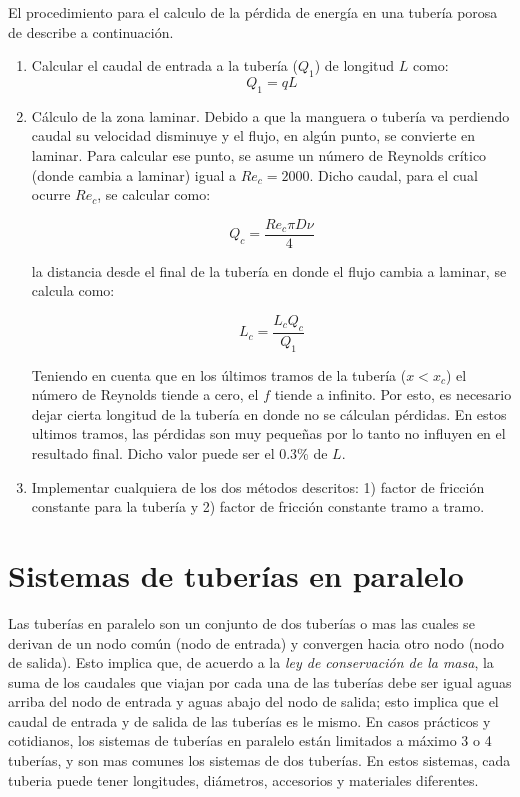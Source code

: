 \documentclass[11pt, oneside]{article}
\begin{document}
El procedimiento para el calculo de la p\'erdida de energ\'ia en una tuber\'ia porosa de describe a continuaci\'on.
\begin{enumerate}
\item Calcular el caudal de entrada a la tuber\'ia  ($Q_1$) de longitud $L$ como:
\begin{equation}
Q_1 = q L
\label{poro14}
\end{equation}

\item C\'alculo de la zona laminar. Debido a que la manguera o tuber\'ia va perdiendo caudal su velocidad disminuye y el flujo, en alg\'un punto, se convierte en laminar. Para calcular ese punto, se asume un n\'umero de Reynolds cr\'itico (donde cambia a laminar) igual a $Re_c=2000$. Dicho caudal, para el cual ocurre $Re_c$, se calcular como:

\begin{equation}
Q_c = \frac{Re_c \pi D \nu}{4}
\label{poro15}
\end{equation}

la distancia desde el final de la tuber\'ia en donde el flujo cambia a laminar, se calcula como:

\begin{equation}
L_c = \frac{L_c Q_c}{Q_1}
\label{poro16}
\end{equation}

Teniendo en cuenta que en los \'ultimos tramos de la tuber\'ia ($x < x_c$) el n\'umero de Reynolds tiende a cero,  el $f$ tiende a infinito. Por esto, es necesario dejar cierta longitud de la tuber\'ia en donde no se c\'alculan p\'erdidas. En estos ultimos tramos, las p\'erdidas son muy peque\~nas por lo tanto no influyen en el resultado final. Dicho valor puede ser el 0.3\% de $L$.

\item Implementar cualquiera de los dos m\'etodos descritos: 1) factor de fricci\'on constante para la tuber\'ia y 2) factor de fricci\'on constante tramo a tramo.

\end{enumerate}


\section{Sistemas de tuber\'ias en paralelo} 
Las tuber\'ias en paralelo son un conjunto de dos tuber\'ias o mas las cuales se derivan de un nodo com\'un (nodo de entrada) y convergen hacia otro nodo (nodo de salida). Esto implica que, de acuerdo a la \emph{ley de conservaci\'on de la masa}, la suma de los caudales que viajan por cada una de las tuber\'ias debe ser igual aguas arriba del nodo de entrada y aguas abajo del nodo de salida; esto implica que el caudal de entrada y de salida de las tuber\'ias es le mismo. En casos pr\'acticos y cotidianos, los sistemas de tuber\'ias en paralelo est\'an limitados a m\'aximo 3 o 4 tuber\'ias, y son mas comunes los sistemas de dos tuber\'ias. En estos sistemas, cada tuberia puede tener longitudes, di\'ametros, accesorios y materiales diferentes.  
\end{document}
